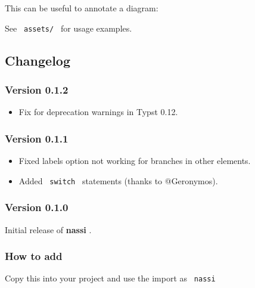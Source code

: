 
This can be useful to annotate a diagram:


See \texttt{\ assets/\ } for usage examples.

\subsection{Changelog}\label{changelog}

\subsubsection{Version 0.1.2}\label{version-0.1.2}

\begin{itemize}
\tightlist
\item
  Fix for deprecation warnings in Typst 0.12.
\end{itemize}

\subsubsection{Version 0.1.1}\label{version-0.1.1}

\begin{itemize}
\tightlist
\item
  Fixed labels option not working for branches in other elements.
\item
  Added \texttt{\ switch\ } statements (thanks to @Geronymos).
\end{itemize}

\subsubsection{Version 0.1.0}\label{version-0.1.0}

Initial release of \textbf{nassi} .

\subsubsection{How to add}\label{how-to-add}

Copy this into your project and use the import as \texttt{\ nassi\ }

